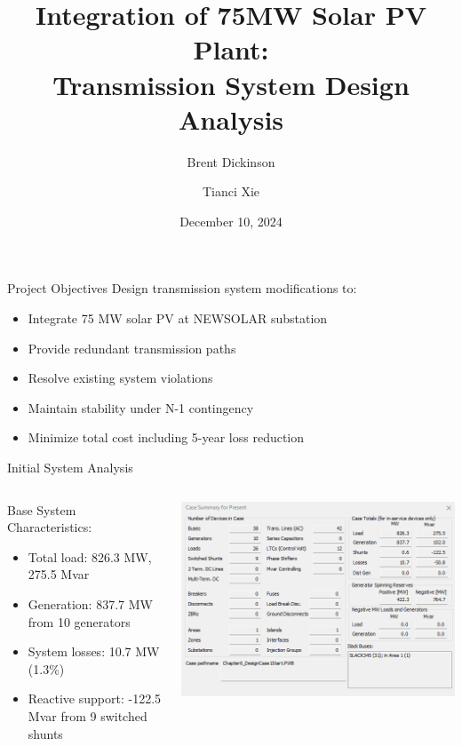 \documentclass{beamer}
\title[75MW Solar Plant Integration]{Integration of 75MW Solar PV Plant:\\Transmission System Design Analysis}
\author{Brent Dickinson \and Tianci Xie}
\date{December 10, 2024}
\begin{document}
	
	\begin{frame}
		\titlepage
	\end{frame}
	
	\begin{frame}{Project Objectives}
		Design transmission system modifications to:
		\begin{itemize}
			\item Integrate 75 MW solar PV at NEWSOLAR substation
			\item Provide redundant transmission paths
			\item Resolve existing system violations
			\item Maintain stability under N-1 contingency
			\item Minimize total cost including 5-year loss reduction
		\end{itemize}
	\end{frame}
	
	\begin{frame}{Initial System Analysis}
		\begin{columns}[T]
			\begin{column}{0.4\textwidth}
				Base System Characteristics:
				\begin{itemize}
					\item Total load: 826.3 MW, 275.5 Mvar
					\item Generation: 837.7 MW from 10 generators
					\item System losses: 10.7 MW (1.3\%)
					\item Reactive support: -122.5 Mvar from 9 switched shunts
				\end{itemize}
			\end{column}
			\begin{column}{0.6\textwidth}
				\includegraphics[width=1\linewidth]{figures/case_summary_existing}
			\end{column}
		\end{columns}
	\end{frame}
	
\end{document}
